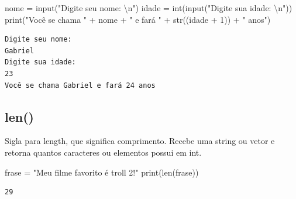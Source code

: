 \documentclass[
  letterpaper,
  DIV=11,
  numbers=noendperiod]{scrreprt}
\newenvironment{Shaded}{\begin{snugshade}}{\end{snugshade}}
\newcommand{\BuiltInTok}[1]{\textcolor[rgb]{0.00,0.23,0.31}{#1}}
\newcommand{\CharTok}[1]{\textcolor[rgb]{0.13,0.47,0.30}{#1}}
\newcommand{\DecValTok}[1]{\textcolor[rgb]{0.68,0.00,0.00}{#1}}
\newcommand{\NormalTok}[1]{\textcolor[rgb]{0.00,0.23,0.31}{#1}}
\newcommand{\OperatorTok}[1]{\textcolor[rgb]{0.37,0.37,0.37}{#1}}
\newcommand{\StringTok}[1]{\textcolor[rgb]{0.13,0.47,0.30}{#1}}
\begin{document}
\begin{Shaded}
\begin{Highlighting}[]
\NormalTok{nome }\OperatorTok{=} \BuiltInTok{input}\NormalTok{(}\StringTok{"Digite seu nome: }\CharTok{\textbackslash{}n}\StringTok{"}\NormalTok{)}
\NormalTok{idade }\OperatorTok{=} \BuiltInTok{int}\NormalTok{(}\BuiltInTok{input}\NormalTok{(}\StringTok{"Digite sua idade: }\CharTok{\textbackslash{}n}\StringTok{"}\NormalTok{))}
\BuiltInTok{print}\NormalTok{(}\StringTok{"Você se chama "} \OperatorTok{+}\NormalTok{ nome }\OperatorTok{+} \StringTok{" e fará "} \OperatorTok{+} \BuiltInTok{str}\NormalTok{((idade }\OperatorTok{+} \DecValTok{1}\NormalTok{)) }\OperatorTok{+} \StringTok{" anos"}\NormalTok{)}
\end{Highlighting}
\end{Shaded}

\begin{tcolorbox}[enhanced jigsaw, breakable, leftrule=.75mm, left=2mm, opacityback=0, bottomrule=.15mm, toprule=.15mm, rightrule=.15mm, arc=.35mm, colback=white]

\begin{verbatim}
Digite seu nome:
Gabriel
Digite sua idade:
23
Você se chama Gabriel e fará 24 anos
\end{verbatim}

\end{tcolorbox}

\hypertarget{len}{%
\subsection{len()}\label{len}}

Sigla para length, que significa comprimento. Recebe uma string ou vetor
e retorna quantos caracteres ou elementos possui em int.

\begin{Shaded}
\begin{Highlighting}[]
\NormalTok{frase }\OperatorTok{=} \StringTok{"Meu filme favorito é troll 2!"}
\BuiltInTok{print}\NormalTok{(}\BuiltInTok{len}\NormalTok{(frase))}
\end{Highlighting}
\end{Shaded}

\begin{tcolorbox}[enhanced jigsaw, breakable, leftrule=.75mm, left=2mm, opacityback=0, bottomrule=.15mm, toprule=.15mm, rightrule=.15mm, arc=.35mm, colback=white]

\begin{verbatim}
29
\end{verbatim}

\end{tcolorbox}
\end{document}

